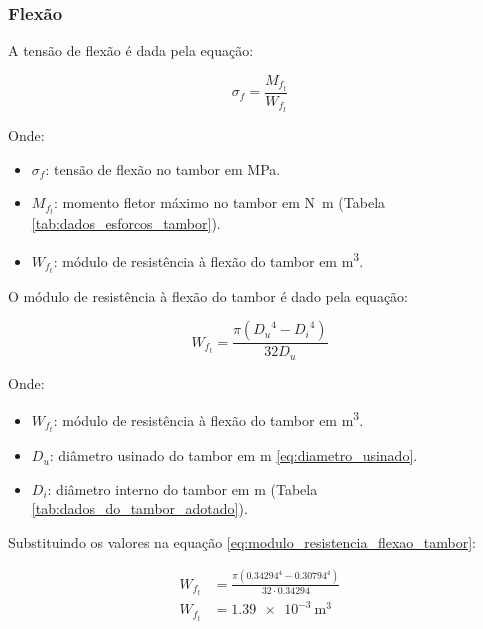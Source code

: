 \subsubsection{Flexão}

A tensão de flexão é dada pela equação:

\begin{equation}
  \sigma_f = \frac{M_{f_t}}{W_{f_t}}
  \label{eq:tensao_flexao_tambor}
\end{equation}

Onde:

\begin{itemize}
  \item $\sigma_f$: tensão de flexão no tambor em \si{\mega\pascal}.
  \item $M_{f_t}$: momento fletor máximo no tambor em \si{\newton\meter} (Tabela \ref{tab:dados_esforcos_tambor}).
  \item $W_{f_t}$: módulo de resistência à flexão do tambor em \si{\meter\cubed}.
\end{itemize}

\vspace{1em}

O módulo de resistência à flexão do tambor é dado pela equação:

\begin{equation}
  W_{f_t} = \frac{\pi \left( {D_u}^4 - {D_i}^4 \right)}{32 D_u}
  \label{eq:modulo_resistencia_flexao_tambor}
\end{equation}

Onde:

\begin{itemize}
  \item $W_{f_t}$: módulo de resistência à flexão do tambor em \si{\meter\cubed}.
  \item $D_u$: diâmetro usinado do tambor em \si{\meter} \eqref{eq:diametro_usinado}.
  \item $D_i$: diâmetro interno do tambor em \si{\meter} (Tabela \ref{tab:dados_do_tambor_adotado}).
\end{itemize}

\vspace{1em}

Substituindo os valores na equação \eqref{eq:modulo_resistencia_flexao_tambor}:

\begin{align*}
  W_{f_t} & = \frac{\pi \left( \num{0.34294}^4 - \num{0.30794}^4 \right)}{32 \cdot \num{0.34294}} \\
  W_{f_t} & = \boxed{\SI{1.39e-3}{\meter\cubed}}
\end{align*}

